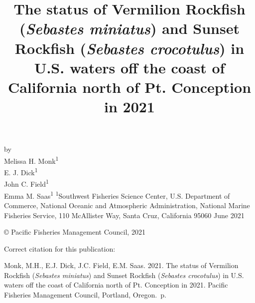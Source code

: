 \documentclass[11pt,
  english,
  a4paper,
]{article}
\date{}
\newcommand{\trTitle}{The status of Vermilion Rockfish (\emph{Sebastes miniatus}) and Sunset Rockfish (\emph{Sebastes crocotulus}) in U.S. waters off the coast of California north of Pt. Conception in 2021}
\newcommand{\trYear}{2021}
\newcommand{\trMonth}{June}
\newcommand{\trAuthsBack}{Monk, M.H., E.J. Dick, J.C. Field, E.M. Saas}
\newcommand{\trCitation}{
\begin{hangparas}{1em}{1}
\trAuthsBack{}. \trYear{}. \trTitle{}. Pacific Fisheries Management Council, Portland, Oregon. \pageref{LastPage}{}\,p.
\end{hangparas}}
\begin{document}

\renewcommand*{\thefootnote}{\fnsymbol{footnote}}

\small
\thispagestyle{empty}
\noindent
\begin{center}
\title{The status of Vermilion Rockfish (\emph{Sebastes miniatus}) and Sunset Rockfish (\emph{Sebastes crocotulus}) in U.S. waters off the coast of California north of Pt. Conception in 2021}
\vspace{1.5cm}
{\Large\textbf{}}
\vfill
by\\
Melissa H. Monk\textsuperscript{1}\\
E. J. Dick\textsuperscript{1}\\
John C. Field\textsuperscript{1}\\
Emma M. Saas\textsuperscript{1}\vfill
\textsuperscript{1}Southwest Fisheries Science Center, U.S. Department of Commerce, National Oceanic and Atmospheric Administration, National Marine Fisheries Service, 110 McAllister Way, Santa Cruz, California 95060\vfill
\trMonth{} \trYear{}
\end{center}
\clearpage

\thispagestyle{empty}
\vspace*{\fill}
\begin{center}
\copyright{} Pacific Fisheries Management Council, \trYear{}\\
\end{center}
\par
\bigskip
\noindent
Correct citation for this publication:
\bigskip
\par
\trCitation{}
\clearpage


\tableofcontents\clearpage
\label{TRlastRoman}
\clearpage

\newpage
\thispagestyle{empty} %

\pagestyle{plain}  %
\renewcommand*{\thefootnote}{\arabic{footnote}}  %
\setcounter{footnote}{0}  %
\renewcommand{\headrulewidth}{0.5pt}
\renewcommand{\footrulewidth}{0.5pt}
\end{document}
